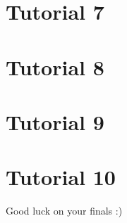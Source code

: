 \documentclass{article}
\theoremstyle{remark}
\theoremstyle{definition}
\numberwithin{equation}{section}
\begin{document}
\setcounter{section}{7}
\section{\centering Tutorial 7}



\newpage 

\setcounter{section}{8}
\section{\centering Tutorial 8}



\newpage 

\setcounter{section}{9}
\section{\centering Tutorial 9}



\newpage 

\setcounter{section}{10}
\section{\centering Tutorial 10}



\vspace{1cm}
\begin{center}
    Good luck on your finals :)
\end{center}
\end{document}
